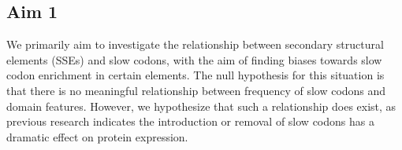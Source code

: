 \documentclass[11pt]{nih}
\begin{document}

\subsection{Aim 1}
We primarily aim to investigate the relationship between secondary structural elements (SSEs) and slow codons, with the aim of finding biases towards slow codon enrichment in certain elements. The null hypothesis for this situation is that there is no meaningful relationship between frequency of slow codons and domain features. However, we hypothesize that such a relationship does exist, as previous research indicates the introduction or removal of slow codons has a dramatic effect on protein expression. 
\end{document}
